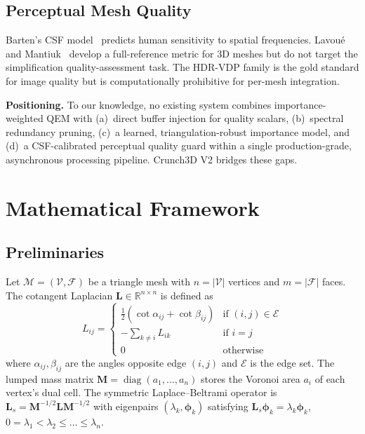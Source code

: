 \documentclass[10pt, twocolumn, a4paper]{article}
\newcommand{\mat}[1]{\mathbf{#1}}
\newcommand{\RR}{\mathbb{R}}
\newcommand{\calM}{\mathcal{M}}
\begin{document}
\subsection{Perceptual Mesh Quality}
Barten's CSF model~\cite{barten1999contrast} predicts human sensitivity
to spatial frequencies. Lavou\'e and Mantiuk~\cite{lavoue2015quality}
develop a full-reference metric for 3D meshes but do not target the
simplification quality-assessment task. The HDR-VDP family
\cite{mantiuk2011hdrvdp} is the gold standard for image quality but is
computationally prohibitive for per-mesh integration.

\noindent\textbf{Positioning.} To our knowledge, no existing system combines
importance-weighted QEM with (a)~direct buffer injection for quality
scalars, (b)~spectral redundancy pruning, (c)~a learned,
triangulation-robust importance model, and (d)~a CSF-calibrated
perceptual quality guard within a single production-grade,
asynchronous processing pipeline. Crunch3D V2 bridges these gaps.

\section{Mathematical Framework}
\label{sec:math}

\subsection{Preliminaries}
Let $\calM = (\mathcal{V}, \mathcal{F})$ be a triangle mesh with
$n = |\mathcal{V}|$ vertices and $m = |\mathcal{F}|$ faces. The
cotangent Laplacian $\mat{L} \in \RR^{n \times n}$ is defined as
\begin{equation}
  \label{eq:laplacian}
  L_{ij} = \begin{cases}
    \frac{1}{2}(\cot\alpha_{ij} + \cot\beta_{ij}) & \text{if } (i,j) \in \mathcal{E} \\
    -\sum_{k \neq i} L_{ik} & \text{if } i = j \\
    0 & \text{otherwise}
  \end{cases}
\end{equation}
where $\alpha_{ij}, \beta_{ij}$ are the angles opposite edge $(i,j)$
and $\mathcal{E}$ is the edge set. The lumped mass matrix
$\mat{M} = \operatorname{diag}(a_1, \dots, a_n)$ stores the Voronoi
area $a_i$ of each vertex's dual cell. The symmetric
Laplace--Beltrami operator is $\mat{L}_s = \mat{M}^{-1/2} \mat{L}
\mat{M}^{-1/2}$ with eigenpairs $(\lambda_k, \bm{\phi}_k)$ satisfying
$\mat{L}_s \bm{\phi}_k = \lambda_k \bm{\phi}_k$,
$0 = \lambda_1 < \lambda_2 \leq \dots \leq \lambda_n$.
\end{document}
